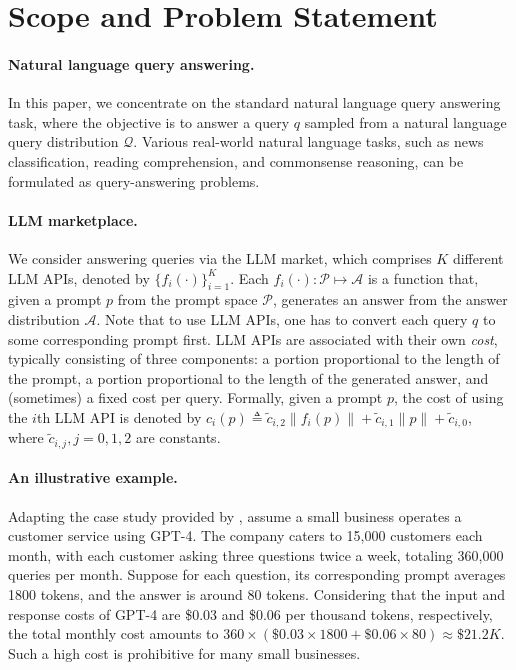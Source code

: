 \documentclass{article}
\numberwithin{equation}{section}
\newcommand{\prompt}{p}
\newcommand{\query}{q}
\newcommand{\cost}{c}
\begin{document}
\section{Scope and Problem Statement}\label{sec:AML:Prelim}

\paragraph{Natural language query answering.}
In this paper, we concentrate on the standard natural language query answering task, where the objective is to answer a query $\query$ sampled from a natural language query distribution $\mathcal{Q}$. Various real-world natural language tasks, such as news classification, reading comprehension, and commonsense reasoning,  can be formulated as query-answering problems.

\paragraph{LLM marketplace.}
We consider answering queries via the LLM market, which comprises $K$ different LLM APIs, denoted by $\{f_i(\cdot)\}_{i=1}^{K}$. Each $f_i(\cdot): \mathcal{P}\mapsto \mathcal{A}$ is a function that, given a prompt $\prompt$ from the prompt space $\mathcal{P}$, generates an answer  from the answer distribution $\mathcal{A}$. 
Note that to use LLM APIs, one has to convert each query $\query$ to some corresponding prompt first. LLM APIs are associated with their own \textit{cost}, typically consisting of three components: a portion proportional to the length of the prompt, a portion proportional to the length of the generated answer, and (sometimes) a fixed cost per query. Formally, given a prompt $p$, the cost of using the $i$th LLM API is denoted by $\cost_i(\prompt) \triangleq \tilde{c}_{i,2}\|f_i(\prompt)\|+ \tilde{c}_{i,1} \|\prompt\| + \tilde{c}_{i,0}$, where $\tilde{c}_{i,j},j=0,1,2$ are constants. 

\paragraph{An illustrative example.} Adapting the case study provided by \cite{CostEstChatGPT}, assume a small business operates a customer service using GPT-4. The company caters to 15,000 customers each month, with each customer asking three questions twice a week, totaling 360,000 queries per month. Suppose for each question, its corresponding prompt averages 1800 tokens, and the answer is around 80 tokens. Considering that the input and response costs of GPT-4 are \$0.03 and \$0.06 per thousand tokens, respectively, the total monthly cost amounts to $360\times (\$0.03\times 1800+\$0.06\times 80)\approx\$21.2K$. 
 Such a high cost is prohibitive for many small businesses.
\end{document}
